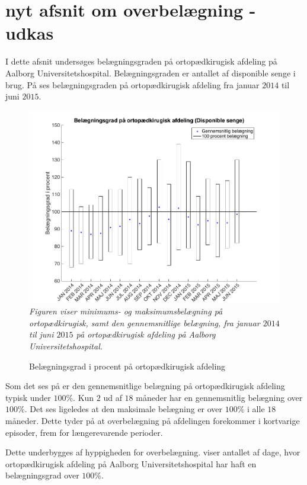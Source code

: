 \section{nyt afsnit om overbelægning - udkas}

I dette afsnit undersøges belægningsgraden på ortopædkirugisk afdeling på Aalborg Universitetshospital. Belægningsgraden er antallet af disponible senge i brug. På  ses belægningsgraden på ortopædkirugisk afdeling fra januar $2014$ til juni $2015$.\cite{SDS2015}

\begin{figure}[H]
	\flushleft 
	\caption{Belægningsgrad i procent på ortopædkirugisk afdeling}
	\centering
	\includegraphics[scale=.45]{figures/maxminoverbelaeg.png}
	\label{maxminbelaeg}
	\flushleft
	\textit{Figuren viser minimums- og maksimumsbelægning på ortopædkirugisk, samt den gennemsnitlige belægning, fra januar $2014$ til juni $2015$ på ortopædkirugisk afdeling på Aalborg Universitetshospital.\cite{SDS2015}}
\end{figure}

Som det ses på  er den gennemsnitlige belægning på ortopædkirugisk afdeling typisk under $100$\%. Kun $2$ ud af $18$ måneder har en gennemsnitlig belægning over $100$\%. Det ses ligeledes at den maksimale belægning er over $100$\% i alle $18$ måneder. Dette tyder på at overbelægning på afdelingen forekommer i kortvarige episoder, frem for længerevarende perioder.\cite{SDS2015}

Dette underbygges af hyppigheden for overbelægning.  viser antallet af dage, hvor ortopædkirugisk afdeling på Aalborg Universitetshospital har haft en belægningsgrad over $100$\%.\cite{SDS2015}

